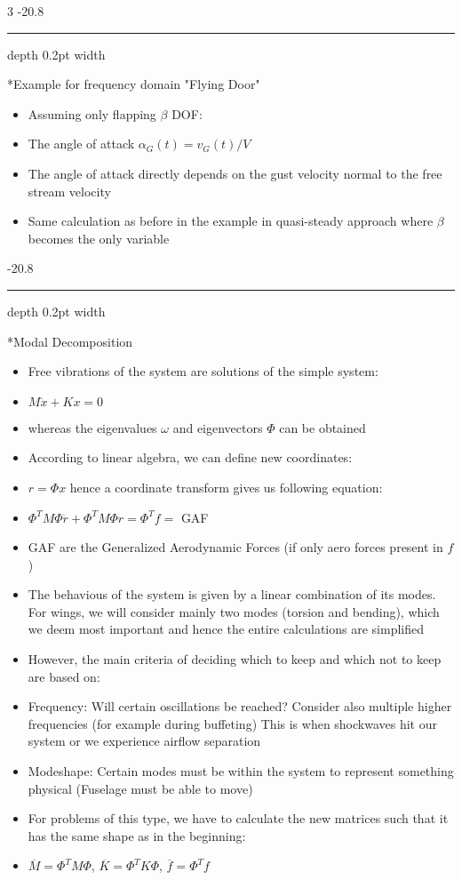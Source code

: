 \documentclass[8pt, landscape, fleqn]{scrartcl}
\makeatletter
\renewcommand{\subsubsection}{\@startsection{subsubsection}{1}{0mm}%
{-2\baselineskip}{0.8\baselineskip}%
{\hrule depth 0.2pt width\columnwidth\vspace*{1.2em}\normalsize\bfseries\rmfamily}}
\makeatother
\begin{document}
\begin{multicols*}{3}
 \subsubsection*{Example for frequency domain "Flying Door"}
 
    \begin{itemize}
        \item Assuming only flapping $\beta$ DOF:
        \item The angle of attack $\alpha_G (t) = v_G(t)/V$ 
        \item The angle of attack directly depends on the gust velocity normal to the free stream velocity
        \item Same calculation as before in the example in quasi-steady approach where $\beta$ becomes the only variable
    \end{itemize}

 \subsubsection*{Modal Decomposition}   

\begin{itemize}
    \item Free vibrations of the system are solutions of the simple system:
    \item $M \ddot{x} + K x = 0$
    \item whereas the eigenvalues $\omega$ and eigenvectors $\Phi$ can be obtained
    \item According to linear algebra, we can define new coordinates:
    \item $r = \Phi x$ hence a coordinate transform gives us following equation:
    \item $\Phi^T M \Phi \ddot{r} + \Phi^T M \Phi r = \Phi^T f = $ GAF
    \item GAF are the Generalized Aerodynamic Forces (if only aero forces present in $f$)
    \item The behavious of the system is given by a linear combination of its modes. For wings, we will consider
    mainly two modes (torsion and bending), which we deem most important and hence the entire calculations are simplified
    \item However, the main criteria of deciding which to keep and which not to keep are based on:
    \item Frequency: Will certain oscillations be reached? Consider also multiple higher frequencies (for example during buffeting)
    This is when shockwaves hit our system or we experience airflow separation
    \item Modeshape: Certain modes must be within the system to represent something physical (Fuselage must be able to move) 
    \item For problems of this type, we have to calculate the new matrices such that it has the same shape as in the beginning:
    \item $\overline{M} = \Phi^T M \Phi$,  $\overline{K} = \Phi^T K \Phi$,  $\overline{f} = \Phi^T f$
\end{itemize}


\end{multicols*}
\end{document}
